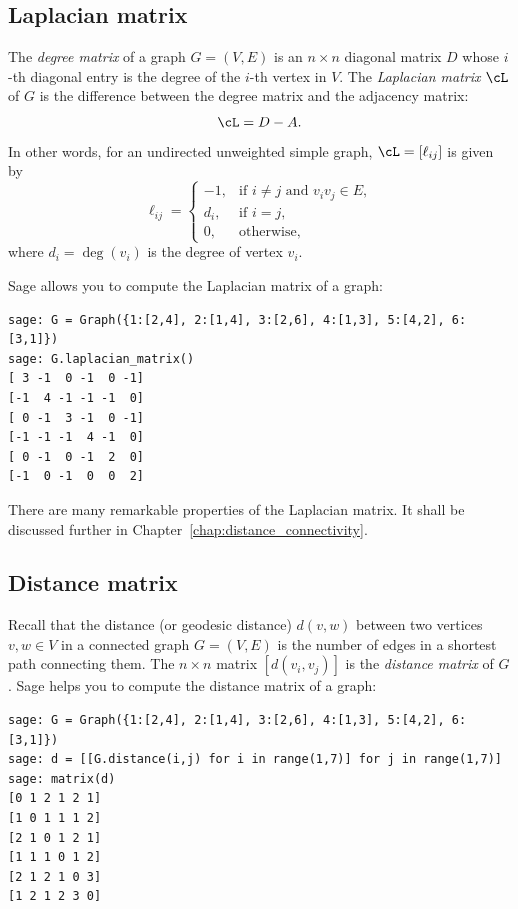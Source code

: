 
\subsection{Laplacian matrix}

The \emph{degree matrix} of a graph $G = (V,E)$
is an $n \times n$ diagonal matrix $D$ whose $i$-th diagonal entry is
the degree of the $i$-th vertex in $V$. The
\emph{Laplacian matrix} $\cL$\index{$\cL$} of
$G$ is the difference between the degree matrix and the adjacency
matrix:
\[
\cL = D - A.
\]
In other words, for an undirected unweighted simple graph,
$\cL = [\ell_{ij}]$ is given by
\[
\ell_{ij}
=
\begin{cases}
-1,  & \text{if $i \neq j$ and $v_i v_j \in E$}, \\
d_i, & \text{if $i = j$}, \\
0,   & \text{otherwise},
\end{cases}
\]
where $d_i = \deg(v_i)$ is the degree of vertex $v_i$.

Sage allows you to compute the Laplacian matrix of a graph:
\begin{lstlisting}
sage: G = Graph({1:[2,4], 2:[1,4], 3:[2,6], 4:[1,3], 5:[4,2], 6:[3,1]})
sage: G.laplacian_matrix()
[ 3 -1  0 -1  0 -1]
[-1  4 -1 -1 -1  0]
[ 0 -1  3 -1  0 -1]
[-1 -1 -1  4 -1  0]
[ 0 -1  0 -1  2  0]
[-1  0 -1  0  0  2]
\end{lstlisting}
There are many remarkable properties of the Laplacian matrix. It shall
be discussed further in Chapter~\ref{chap:distance_connectivity}.



\subsection{Distance matrix}

Recall that the distance (or geodesic distance) $d(v,w)$ between two
vertices $v,w \in V$ in a connected graph $G = (V,E)$ is the number of
edges in a shortest path connecting them. The $n \times n$ matrix
$[d(v_i, v_j)]$ is the \emph{distance matrix}
of $G$. Sage helps you to compute the distance matrix of a graph:
\begin{lstlisting}
sage: G = Graph({1:[2,4], 2:[1,4], 3:[2,6], 4:[1,3], 5:[4,2], 6:[3,1]})
sage: d = [[G.distance(i,j) for i in range(1,7)] for j in range(1,7)]
sage: matrix(d)
[0 1 2 1 2 1]
[1 0 1 1 1 2]
[2 1 0 1 2 1]
[1 1 1 0 1 2]
[2 1 2 1 0 3]
[1 2 1 2 3 0]
\end{lstlisting}

